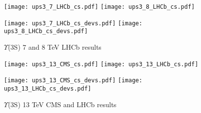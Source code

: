 \documentclass{article}
\begin{document}
\clearpage

\begin{figure}
\centering
\texttt{[image: ups3\_7\_LHCb\_cs.pdf]}
\texttt{[image: ups3\_8\_LHCb\_cs.pdf]}

\texttt{[image: ups3\_7\_LHCb\_cs\_devs.pdf]}
\texttt{[image: ups3\_8\_LHCb\_cs\_devs.pdf]}
\caption{$\Upsilon$(3S) 7 and 8 TeV LHCb results}
\end{figure}

\clearpage

\begin{figure}
\centering
\texttt{[image: ups3\_13\_CMS\_cs.pdf]}
\texttt{[image: ups3\_13\_LHCb\_cs.pdf]}

\texttt{[image: ups3\_13\_CMS\_cs\_devs.pdf]}
\texttt{[image: ups3\_13\_LHCb\_cs\_devs.pdf]}
\caption{$\Upsilon$(3S) 13 TeV CMS and LHCb results}
\end{figure}


\clearpage
\restoregeometry



\pagebreak


\end{document}
